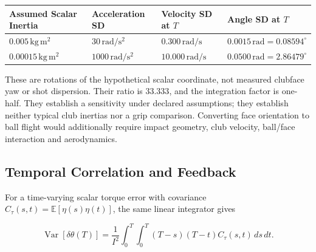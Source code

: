 \documentclass[
  11pt,
]{article}
\begin{document}
\begin{longtable}[]{@{}
  >{\raggedright\arraybackslash}p{}
  >{\raggedleft\arraybackslash}p{}
  >{\raggedleft\arraybackslash}p{}
  >{\raggedleft\arraybackslash}p{}@{}}
\toprule\noalign{}
\begin{minipage}[b]{\linewidth}\raggedright
Assumed Scalar Inertia
\end{minipage} & \begin{minipage}[b]{\linewidth}\raggedleft
Acceleration SD
\end{minipage} & \begin{minipage}[b]{\linewidth}\raggedleft
Velocity SD at \(T\)
\end{minipage} & \begin{minipage}[b]{\linewidth}\raggedleft
Angle SD at \(T\)
\end{minipage} \\
\midrule\noalign{}
\endhead
\bottomrule\noalign{}
\endlastfoot
\(0.005\,\mathrm{kg\,m^2}\) & \(30\,\mathrm{rad/s^2}\) &
\(0.300\,\mathrm{rad/s}\) & \(0.0015\,\mathrm{rad}=0.08594^\circ\) \\
\(0.00015\,\mathrm{kg\,m^2}\) & \(1000\,\mathrm{rad/s^2}\) &
\(10.000\,\mathrm{rad/s}\) & \(0.0500\,\mathrm{rad}=2.86479^\circ\) \\
\end{longtable}

These are rotations of the hypothetical scalar coordinate, not measured
clubface yaw or shot dispersion. Their ratio is \(33.333\), and the
integration factor is one-half. They establish a sensitivity under
declared assumptions; they establish neither typical club inertias nor a
grip comparison. Converting face orientation to ball flight would
additionally require impact geometry, club velocity, ball/face
interaction and aerodynamics.

\subsection{Temporal Correlation and
Feedback}\label{temporal-correlation-and-feedback}

For a time-varying scalar torque error with covariance
\(C_\tau(s,t)=\mathbb E[\eta(s)\eta(t)]\), the same linear integrator
gives

\[
\operatorname{Var}[\delta\theta(T)]
=\frac{1}{I^2}\int_0^T\int_0^T
(T-s)(T-t)C_\tau(s,t)\,ds\,dt.
\]
\end{document}
